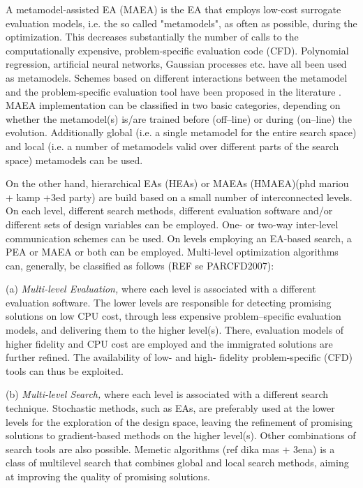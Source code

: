 A metamodel-assisted EA (MAEA) is the EA that employs low-cost surrogate evaluation models, i.e. the so called "metamodels", as often as possible, during the optimization. This decreases substantially the number of calls to the computationally expensive, problem-specific evaluation code (CFD). Polynomial regression, artificial neural networks, Gaussian processes etc. have all been used as metamodels. Schemes based on different interactions between the metamodel and the problem-specific evaluation tool have been proposed in the literature \cite{KEANEbook,LTT_2_020,Jin2002,LTT_2_027}. MAEA implementation can be classified in two basic categories, depending on whether the metamodel(s) is/are trained before (off–line) or during (on–line) the evolution. Additionally global (i.e. a single metamodel for the entire search space) and local (i.e. a number of metamodels valid over different parts of the search space) metamodels can be used.

On the other hand, hierarchical EAs (HEAs) or MAEAs (HMAEA)(phd mariou + kamp +3ed party) are build based on a small number of interconnected levels. On each level, different search methods, different evaluation software and/or different sets of design variables can be employed. One- or two-way inter-level communication schemes can be used. On levels employing an EA-based search, a PEA or MAEA or both can be employed. Multi-level optimization algorithms can, generally, be classified as follows (REF se PARCFD2007):

(a) \emph{Multi-level Evaluation,} where each level is associated with
a different evaluation software. The lower levels are responsible
for detecting promising solutions  on low CPU cost, through less
expensive problem--specific evaluation models, and
delivering them to the higher level(s). There, evaluation models of
higher fidelity and CPU cost are employed and the immigrated
solutions are further refined. The availability of low- and  high- fidelity problem-specific (CFD) tools can thus be exploited.

(b) \emph{Multi-level Search,} where each level is associated with a
different search technique. Stochastic methods, such as EAs, are
preferably used at the lower levels for the exploration of the
design space, leaving the refinement of promising solutions to
gradient-based methods on the higher level(s). Other
combinations of search tools are also possible. Memetic algorithms (ref dika mas + 3ena) is a class of multilevel search that combines global and local search methods, aiming at improving the quality of
promising solutions.


